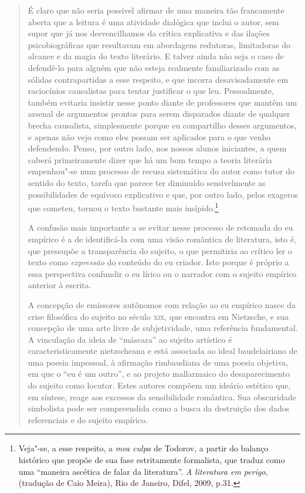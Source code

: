 \begin{quote}
É claro que não seria possível afirmar de uma maneira tão francamente
aberta que a leitura é uma atividade dialógica que inclui o autor, sem
supor que já nos desvencilhamos da crítica explicativa e das ilações
psicobiográficas que resultavam em abordagens redutoras, limitadoras do
alcance e da magia do texto literário. E talvez ainda não seja o caso de
defendê-lo para alguém que não esteja realmente familiarizado com as
sólidas contrapartidas a esse respeito, e que incorra desavisadamente em
raciocínios causalistas para tentar justificar o que leu. Pessoalmente,
também evitaria insistir nesse ponto diante de professores que mantêm um
arsenal de argumentos prontos para serem disparados diante de qualquer
brecha causalista, simplesmente porque eu compartilho desses argumentos,
e apenas não vejo como eles possam ser aplicados para o que venho
defendendo. Penso, por outro lado, nos nossos alunos iniciantes, a quem
caberá primeiramente dizer que há um bom tempo a teoria literária
empenhou"-se num processo de recusa sistemática do autor como tutor do
sentido do texto, tarefa que parece ter diminuído sensivelmente as
possibilidades de equívoco explicativo e que, por outro lado, pelos
exageros que cometeu, tornou o texto bastante mais insípido.\footnote{Veja"-se,
  a esse respeito, a \emph{mea culpa} de Todorov, a partir do balanço
  histórico que propõe de sua fase estritamente formalista, que traduz
  como uma ``maneira ascética de falar da literatura''. \emph{A
  literatura em perigo}, (tradução de Caio Meira), Rio de Janeiro,
  Difel, 2009, p.31.}

A confusão mais importante a se evitar nesse processo de retomada do eu
empírico é a de identificá-la com uma visão romântica de literatura,
isto é, que pressupõe a transparência do sujeito, o que permitiria ao
crítico ler o texto como \emph{expressão} do conteúdo do eu criador.
Isto porque é próprio a essa perspectiva confundir o eu lírico ou o
narrador com o sujeito empírico anterior à escrita.

A concepção de emissores autônomos com relação ao eu empírico nasce da
crise filosófica do sujeito no século \textsc{xix}, que encontra em
Nietzsche, e sua concepção de uma arte livre de subjetividade, uma
referência fundamental. A vinculação da ideia de ``máscara'' ao sujeito
artístico é caracteristicamente nietzscheana e está associada ao ideal
baudelairiano de uma poesia impessoal, à afirmação rimbaudiana de uma
poesia objetiva, em que o ``eu é um outro'', e ao projeto mallarmaico do
desaparecimento do sujeito como locutor. Estes autores compõem um
ideário estético que, em síntese, reage aos excessos da sensibilidade
romântica. Sua obscuridade simbolista pode ser compreendida como a busca
da destruição dos dados referenciais e do sujeito empírico.


\end{quote}
